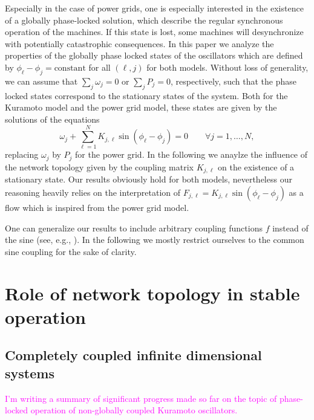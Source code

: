 \documentclass[10pt,aps,pra,onecolumn,superscriptaddress]{revtex4-1}
\newcommand{\debsankha}[1]{\textcolor{magenta}{#1}}
\newcommand{\be}{\begin{equation}}
\newcommand{\ee}{\end{equation}}
\begin{document}
Especially in the case of power grids, one is especially
interested in the existence of a globally phase-locked
solution, which describe the regular synchronous operation
of the machines. If this state is lost, some machines
will desynchronize with potentially catastrophic consequences.
In this paper we analyze the properties of the globally 
phase locked states of the oscillators which are defined
by $\phi_\ell - \phi_j = \mbox{constant}$ for all $(\ell,j)$
for both models. Without loss of generality, we can
assume that $\sum_j \omega_j = 0$ or
$\sum_j P_j = 0$, respectively,
such that the phase locked states correspond to the
stationary states of the system. Both for the Kuramoto
model and the power grid model, these states are given
by the solutions of the equations
\be
       \omega_j  + \sum_{\ell = 1}^N
      K _{j,\ell} \sin(\phi_\ell - \phi_j) =0 \qquad
     \forall j = 1,\ldots, N,
    \label{eqn:def-steady-state}
\ee
replacing $\omega_j$ by $P_j$ for the power grid.
In the following we anaylze the influence of the network
topology given by the coupling matrix $K_{j,\ell}$ on the
existence of a stationary state. Our results obviously hold
for both models, nevertheless our reasoning heavily relies
on the interpretation of $F_{j,\ell}= K _{j,\ell} \sin(\phi_\ell - \phi_j)$
as a flow which is inspired from the power grid model. 

One can generalize our results to include arbitrary coupling
functions $f$ instead of the sine (see, e.g., \cite{Wata93,Bick11}). 
In the following we mostly restrict ourselves to the common 
sine coupling for the sake of clarity.




\section{Role of network topology in stable operation}

\subsection{Completely coupled infinite dimensional systems}
\debsankha{I'm writing a summary of significant progress made so far on the 
topic of phase-locked operation of non-globally coupled Kuramoto oscillators.}
\end{document}
